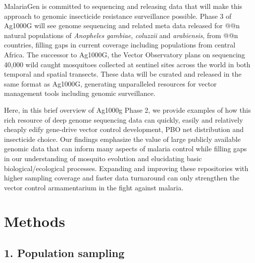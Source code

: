 \documentclass[a4paper,11pt,abstracton,hidelinks]{scrartcl}
\begin{document}
MalariaGen is committed to sequencing and releasing data that will make this approach to genomic insecticide resistance surveillance possible. 
%
Phase 3 of Ag1000G will see genome sequencing and related meta data released for @@n natural populations of \textit{Anopheles gambiae}, \textit{coluzzii} and \textit{arabiensis}, from @@n countries, filling gaps in current coverage including populations from central Africa.
%
The successor to Ag1000G, the Vector Observatory plans on sequencing 40,000 wild caught mosquitoes collected at sentinel sites across the world in both temporal and spatial transects.
%
These data will be curated and released in the same format as Ag1000G, generating unparalleled resources for vector management tools including genomic surveillance. 


Here, in this brief overview of Ag1000g Phase 2, we provide examples of how this rich resource of deep genome sequencing data can quickly, easily and relatively cheaply edify gene-drive vector control development, PBO net distribution and insecticide choice.
%
Our findings emphasize the value of large publicly available genomic data that can inform many aspects of malaria control while filling gaps in our understanding of mosquito evolution and elucidating basic biological/ecological processes.
%
Expanding and improving these repositories with higher sampling coverage and faster data turnaround can only strengthen the vector control armamentarium in the fight against malaria.

\section*{Methods}


\subsection*{1. Population sampling}
\end{document}
